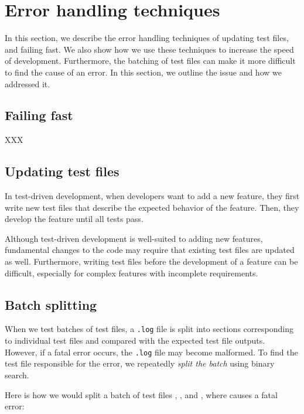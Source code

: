 \documentclass[final]{ltugboat}
\begin{document}
\section{Error handling techniques}
\label{sec:error-handling-techniques}

In this section, we describe the error handling techniques of updating test files, and failing fast. We also show how we use these techniques to increase the speed of development. Furthermore, the batching of test files can make it more difficult to find the cause of an error. In this section, we outline the issue and how we addressed it.

\subsection{Failing fast}

XXX

\subsection{Updating test files}
In test-driven development, when developers want to add a new feature, they first write new test files that describe the expected behavior of the feature. Then, they develop the feature until all tests pass.

Although test-driven development is well-suited to adding new features, fundamental changes to the code may require that existing test files are updated as well. Furthermore, writing test files before the development of a feature can be difficult, especially for complex features with incomplete requirements.



\subsection{Batch splitting}

When we test batches of test files, a \texttt{.log} file is split into sections corresponding to individual test files and compared with the expected test file outputs. However, if a fatal error occurs, the \texttt{.log} file may become malformed. To find the test file responsible for the error, we repeatedly \emph{split the batch} using binary search.

Here is how we would split a batch of test files , , and , where  causes a fatal error:
\end{document}

